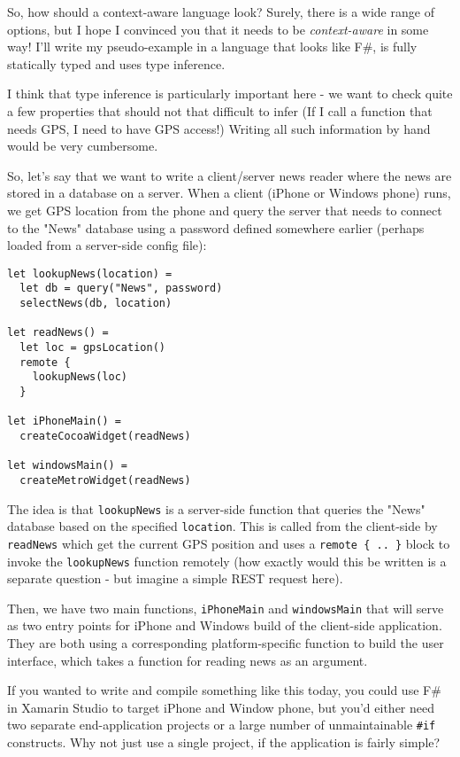 So, how should a context-aware language look? Surely, there is a wide range of options, but I hope
I convinced you that it needs to be \emph{context-aware} in some way! I'll write my pseudo-example in a
language that looks like F\#, is fully statically typed and uses type inference.

I think that type inference is particularly important here - we want to check quite a few properties
that should not that difficult to infer (If I call a function that needs GPS, I need to have GPS access!)
Writing all such information by hand would be very cumbersome.

So, let's say that we want to write a client/server news reader where the news are stored in a 
database on a server. When a client (iPhone or Windows phone) runs, we get GPS location from the
phone and query the server that needs to connect to the "News" database using a password defined
somewhere earlier (perhaps loaded from a server-side config file):

\begin{verbatim}
let lookupNews(location) =
  let db = query("News", password)
  selectNews(db, location)  

let readNews() =
  let loc = gpsLocation()       
  remote { 
    lookupNews(loc) 
  } 

let iPhoneMain() =
  createCocoaWidget(readNews)

let windowsMain() =    
  createMetroWidget(readNews)
\end{verbatim}

The idea is that \texttt{lookupNews} is a server-side function that queries the "News" database based on 
the specified \texttt{location}. This is called from the client-side by \texttt{readNews} which get the current GPS
position and uses a \texttt{remote \{ .. \}} block to invoke the \texttt{lookupNews} function remotely (how exactly would
this be written is a separate question - but imagine a simple REST request here).

Then, we have two main functions, \texttt{iPhoneMain} and \texttt{windowsMain} that will serve as two entry points
for iPhone and Windows build of the client-side application. They are both using a corresponding
platform-specific function to build the user interface, which takes a function for reading news as an
argument.

If you wanted to write and compile something like this today, you could use F\# in Xamarin 
Studio to target iPhone and Window phone, but you'd either need two separate end-application projects 
or a large number of unmaintainable \texttt{\#if} constructs. Why not just use a single project, if 
the application is fairly simple?


